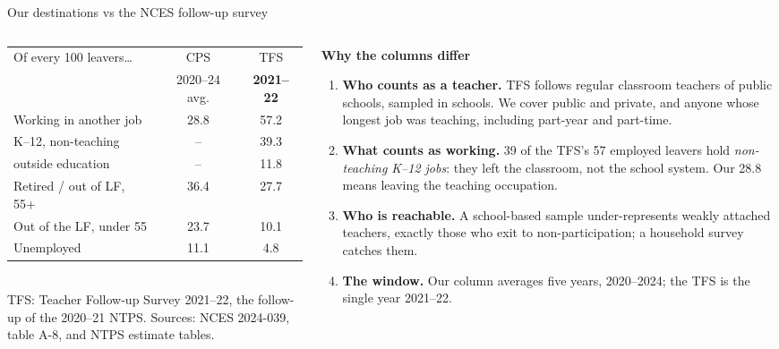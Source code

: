\documentclass[aspectratio=169,11pt]{beamer}
\newcommand{\backbtn}[1]{\vfill\hfill\hyperlink{#1<1>}{\beamerreturnbutton{back}}}
\begin{document}
\begin{frame}[label=apptfs]{Our destinations vs the NCES follow-up survey}
  \vspace{0.2em}
  \begin{columns}[T]
    \begin{column}{0.46\textwidth}
      \footnotesize
      \begin{tabular}{lcc}
        \toprule
        Of every 100 leavers\ldots & CPS & TFS \\
          & {\tiny 2020--24 avg.} & {\tiny \textbf{2021--22}} \\
        \midrule
        Working in another job          & 28.8 & 57.2 \\
        \quad K--12, non-teaching       & --   & 39.3 \\
        \quad outside education         & --   & 11.8 \\
        Retired / out of LF, 55+        & 36.4 & 27.7 \\
        Out of the LF, under 55         & 23.7 & 10.1 \\
        Unemployed                      & 11.1 & 4.8 \\
        \bottomrule
      \end{tabular}\\[0.5em]
      {\tiny TFS: Teacher Follow-up Survey 2021--22, the follow-up of
       the 2020--21 NTPS. Sources: NCES 2024-039, table A-8, and NTPS
       estimate tables.}
    \end{column}
    \begin{column}{0.50\textwidth}
      {\footnotesize {\color{navy}\bfseries Why the columns differ}\\[0.4em]
      \begin{enumerate}\setlength\itemsep{0.45em}
        \item \textbf{Who counts as a teacher.} TFS follows regular
              classroom teachers of public schools, sampled in schools.
              We cover public and private, and anyone whose longest job
              was teaching, including part-year and part-time.
        \item \textbf{What counts as working.} 39 of the TFS's 57
              employed leavers hold \emph{non-teaching K--12 jobs}:
              they left the classroom, not the school system. Our
              28.8 means leaving the teaching occupation.
        \item \textbf{Who is reachable.} A school-based sample
              under-represents weakly attached teachers, exactly those
              who exit to non-participation; a household survey
              catches them.
        \item \textbf{The window.} Our column averages five years,
              2020--2024; the TFS is the single year 2021--22.
      \end{enumerate}}
    \end{column}
  \end{columns}
  \backbtn{mainflow}
\end{frame}
\end{document}
